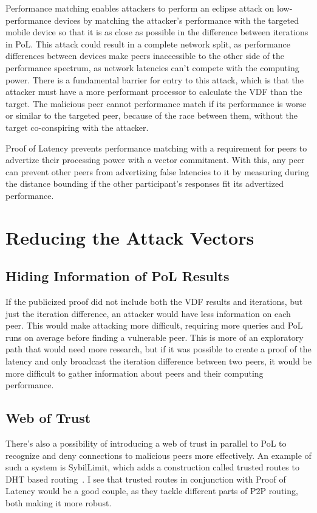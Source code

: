 Performance matching enables attackers to perform an eclipse attack on low-performance devices by matching the attacker's performance with the targeted mobile device so that it is as close as possible in the difference between iterations in PoL. This attack could result in a complete network split, as performance differences between devices make peers inaccessible to the other side of the performance spectrum, as network latencies can't compete with the computing power. There is a fundamental barrier for entry to this attack, which is that the attacker must have a more performant processor to calculate the VDF than the target. The malicious peer cannot performance match if its performance is worse or similar to the targeted peer, because of the race between them, without the target co-conspiring with the attacker.

Proof of Latency prevents performance matching with a requirement for peers to advertize their processing power with a vector commitment. With this, any peer can prevent other peers from advertizing false latencies to it by measuring during the distance bounding if the other participant's responses fit its advertized performance.

\section{Reducing the Attack Vectors}
\subsection{Hiding Information of PoL Results}
If the publicized proof did not include both the VDF results and iterations, but just the iteration difference, an attacker would have less information on each peer. This would make attacking more difficult, requiring more queries and PoL runs on average before finding a vulnerable peer. This is more of an exploratory path that would need more research, but if it was possible to create a proof of the latency and only broadcast the iteration difference between two peers, it would be more difficult to gather information about peers and their computing performance.

\subsection{Web of Trust}
There's also a possibility of introducing a web of trust in parallel to PoL to recognize and deny connections to malicious peers more effectively. An example of such a system is SybilLimit, which adds a construction called trusted routes to DHT based routing~\cite{Yu2008-xl}. I see that trusted routes in conjunction with Proof of Latency would be a good couple, as they tackle different parts of P2P routing, both making it more robust.

